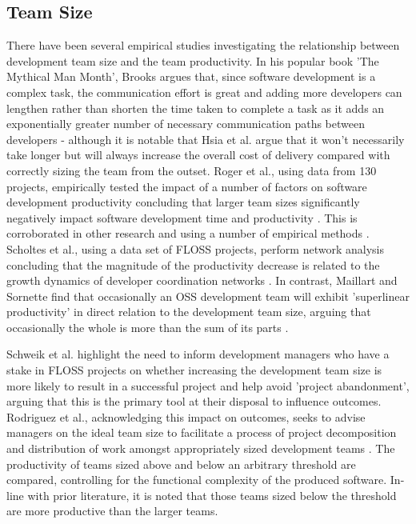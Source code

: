 \subsection{Team Size}
There have been several empirical studies investigating the relationship between development team size and the team productivity. In his popular book 'The Mythical Man Month', Brooks argues that, since software development is a complex task, the communication effort is great and adding more developers can lengthen rather than shorten the time taken to complete a task as it adds an exponentially greater number of necessary communication paths between developers \citep{brooks1986mythical} - although it is notable that Hsia et al. \citep{hsia1999brooks} argue that it won't necessarily take longer but will always increase the overall cost of delivery compared with correctly sizing the team from the outset. Roger et al., using data from 130 projects, empirically tested the impact of a number of factors on software development productivity concluding that larger team sizes significantly negatively impact software development time and productivity \citep{rodger2011knowledge}. This is corroborated in other research and using a number of empirical methods \citep{mcleod2011factors, lalsing2012people}. Scholtes et al., using a data set of FLOSS projects, perform network analysis concluding that the magnitude of the productivity decrease is related to the growth dynamics of developer coordination networks \citep{scholtes2016aristotle}. In contrast, Maillart and Sornette find that occasionally an OSS development team will exhibit 'superlinear productivity' in direct relation to the development team size, arguing that occasionally the whole is more than the sum of its parts \citep{maillart2016aristotle}.

Schweik et al. \citep{schweik2008brooks} highlight the need to inform development managers who have a stake in FLOSS projects on whether increasing the development team size is more likely to result in a successful project and help avoid 'project abandonment', arguing that this is the primary tool at their disposal to influence outcomes. Rodriguez et al., acknowledging this impact on outcomes, seeks to advise managers on the ideal team size to facilitate a process of project decomposition and distribution of work amongst appropriately sized development teams \citep{rodriguez2012empirical}. The productivity of teams sized above and below an arbitrary threshold are compared, controlling for the functional complexity of the produced software. In-line with prior literature, it is noted that those teams sized below the threshold are more productive than the larger teams. 

